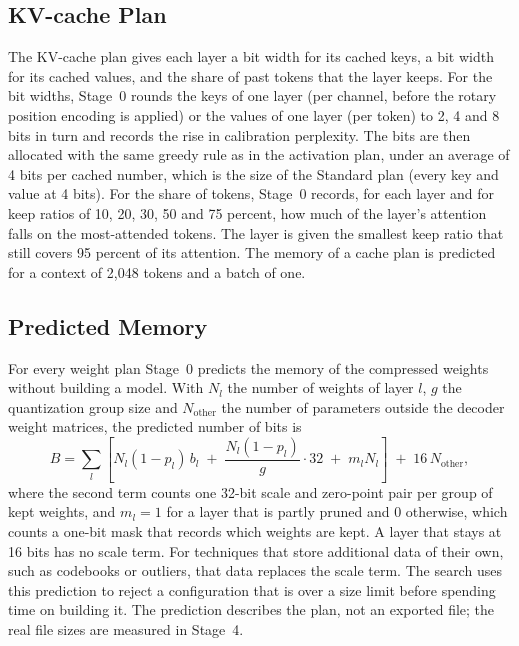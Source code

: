 \subsection{KV-cache Plan}
\label{sec:ch4-kvplan}

The KV-cache plan gives each layer a bit width for its cached keys, a bit width for its cached values, and the share of past tokens that the layer keeps. For the bit widths, Stage~0 rounds the keys of one layer (per channel, before the rotary position encoding is applied) or the values of one layer (per token) to 2, 4 and 8 bits in turn and records the rise in calibration perplexity. The bits are then allocated with the same greedy rule as in the activation plan, under an average of 4 bits per cached number, which is the size of the Standard plan (every key and value at 4 bits). For the share of tokens, Stage~0 records, for each layer and for keep ratios of 10, 20, 30, 50 and 75 percent, how much of the layer's attention falls on the most-attended tokens. The layer is given the smallest keep ratio that still covers 95 percent of its attention. The memory of a cache plan is predicted for a context of 2{,}048 tokens and a batch of one.

\subsection{Predicted Memory}
\label{sec:ch4-cost}

For every weight plan Stage~0 predicts the memory of the compressed weights without building a model. With $N_l$ the number of weights of layer $l$, $g$ the quantization group size and $N_{\mathrm{other}}$ the number of parameters outside the decoder weight matrices, the predicted number of bits is
\begin{equation}
  B = \sum_{l} \left[ N_l (1 - p_l)\, b_l \;+\; \frac{N_l (1 - p_l)}{g} \cdot 32 \;+\; m_l N_l \right] \;+\; 16\, N_{\mathrm{other}},
  \label{eq:ch4-cost}
\end{equation}
where the second term counts one 32-bit scale and zero-point pair per group of kept weights, and $m_l = 1$ for a layer that is partly pruned and $0$ otherwise, which counts a one-bit mask that records which weights are kept. A layer that stays at 16 bits has no scale term. For techniques that store additional data of their own, such as codebooks or outliers, that data replaces the scale term. The search uses this prediction to reject a configuration that is over a size limit before spending time on building it. The prediction describes the plan, not an exported file; the real file sizes are measured in Stage~4.

